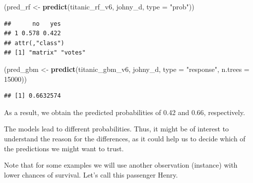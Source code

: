 \documentclass[]{krantz}
\newenvironment{Shaded}{\begin{snugshade}}{\end{snugshade}}
\newcommand{\DataTypeTok}[1]{\textcolor[rgb]{0.13,0.29,0.53}{#1}}
\newcommand{\DecValTok}[1]{\textcolor[rgb]{0.00,0.00,0.81}{#1}}
\newcommand{\KeywordTok}[1]{\textcolor[rgb]{0.13,0.29,0.53}{\textbf{#1}}}
\newcommand{\NormalTok}[1]{#1}
\newcommand{\StringTok}[1]{\textcolor[rgb]{0.31,0.60,0.02}{#1}}
\begin{document}
\begin{Shaded}
\begin{Highlighting}[]
\NormalTok{(pred_rf <-}\StringTok{ }\KeywordTok{predict}\NormalTok{(titanic_rf_v6, johny_d, }\DataTypeTok{type =} \StringTok{"prob"}\NormalTok{))}
\end{Highlighting}
\end{Shaded}

\begin{verbatim}
##      no   yes
## 1 0.578 0.422
## attr(,"class")
## [1] "matrix" "votes"
\end{verbatim}

\begin{Shaded}
\begin{Highlighting}[]
\NormalTok{(pred_gbm <-}\StringTok{ }\KeywordTok{predict}\NormalTok{(titanic_gbm_v6, johny_d, }\DataTypeTok{type =} \StringTok{"response"}\NormalTok{, }\DataTypeTok{n.trees =} \DecValTok{15000}\NormalTok{))}
\end{Highlighting}
\end{Shaded}

\begin{verbatim}
## [1] 0.6632574
\end{verbatim}

As a result, we obtain the predicted probabilities of 0.42 and 0.66, respectively.

The models lead to different probabilities. Thus, it might be of interest to understand the reason for the differences, as it could help us to decide which of the predictions we might want to trust.

Note that for some examples we will use another observation (instance) with lower chances of survival. Let's call this passenger Henry.
\end{document}

